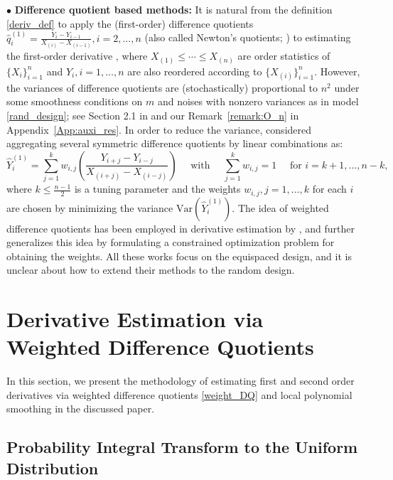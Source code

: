 \documentclass{uwstat572}
\theoremstyle{definition}
\renewcommand{\hat}{\widehat}
\theoremstyle{theorem}
\begin{document}
$\bullet$ {\bf Difference quotient based methods:} It is natural from the definition \eqref{deriv_def} to apply the (first-order) difference quotients $\hat{q}_i^{(1)} = \frac{Y_i - Y_{i-1}}{X_{(i)}- X_{(i-1)}}, i=2,...,n$ (also called Newton's quotients; \citealt{lang1968analysis}) to estimating the first-order derivative \citep{muller1987bandwidth,hardle1990applied,charnigo2011generalized}, where $X_{(1)}\leq \cdots \leq X_{(n)}$ are order statistics of $\{X_i\}_{i=1}^n$ and $Y_i,i=1,...,n$ are also reordered according to $\{X_{(i)}\}_{i=1}^n$. However, the variances of difference quotients are (stochastically) proportional to $n^2$ under some smoothness conditions on $m$ and noises with nonzero variances as in model \eqref{rand_design}; see Section 2.1 in \cite{de2013derivative} and our Remark~\ref{remark:O_n} in Appendix~\ref{App:auxi_res}. In order to reduce the variance, \cite{iserles2009first} considered aggregating several symmetric difference quotients by linear combinations as:
\begin{equation}
\label{weight_DQ}
\hat{Y}_i^{(1)} = \sum_{j=1}^k w_{i,j}\left(\frac{Y_{i+j} - Y_{i-j}}{X_{(i+j)} - X_{(i-j)}}\right) \quad \text{ with } \quad \sum_{j=1}^k w_{i,j}=1 \quad \text{ for } i=k+1,...,n-k,
\end{equation}
where $k \leq \frac{n-1}{2}$ is a tuning parameter and the weights $w_{i,j}, j=1,...,k$ for each $i$ are chosen by minimizing the variance $\mathrm{Var}(\hat{Y}_i^{(1)})$. The idea of weighted difference quotients has been employed in derivative estimation by \cite{de2013derivative,wang2015derivative}, and \cite{dai2016optimal} further generalizes this idea by formulating a constrained optimization problem for obtaining the weights. All these works focus on the equispaced design, and it is unclear about how to extend their methods to the random design. 


\section{Derivative Estimation via Weighted Difference Quotients}
\label{Sec:method}

In this section, we present the methodology of estimating first and second order derivatives via weighted difference quotients \eqref{weight_DQ} and local polynomial smoothing in the discussed paper. 

\subsection{Probability Integral Transform to the Uniform Distribution}
\label{Sec:PIT}
\end{document}
